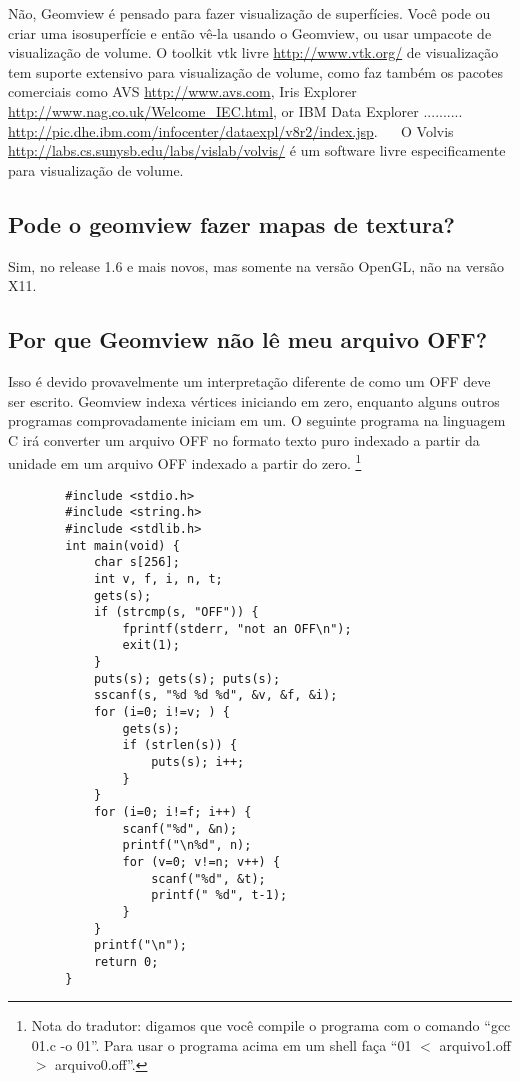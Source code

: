 \documentclass[12pt,a4paper]{article}
\begin{document}
        N\~ao, Geomview \'e pensado para fazer visualiza\c{c}\~ao de superf\'icies. Voc\^e pode ou
        criar uma isosuperf\'icie e ent\~ao v\^e-la usando o Geomview, ou usar umpacote de
        visualiza\c{c}\~ao de volume. O toolkit vtk livre \url{http://www.vtk.org/}
        de visualiza\c{c}\~ao tem suporte extensivo para visualiza\c{c}\~ao de volume, como faz tamb\'em
        os pacotes comerciais como AVS \url{http://www.avs.com}, Iris Explorer
        \url{http://www.nag.co.uk/Welcome\_IEC.html}, or IBM Data Explorer
        ..........\\ \url{http://pic.dhe.ibm.com/infocenter/dataexpl/v8r2/index.jsp}. \,\,\,\,\,\,\,\,O Volvis
        \url{http://labs.cs.sunysb.edu/labs/vislab/volvis/} \'e um software livre especificamente para
        visualiza\c{c}\~ao de volume.

    \subsection{Pode o geomview fazer mapas de textura?}

        Sim, no release 1.6 e mais novos, mas somente na vers\~ao OpenGL, n\~ao na
        vers\~ao X11.

    \subsection{Por que Geomview n\~ao l\^e meu arquivo OFF?}

        Isso \'e devido provavelmente um interpreta\c{c}\~ao diferente de como um OFF deve
        ser escrito. Geomview indexa v\'ertices iniciando em zero, enquanto alguns outros
        programas comprovadamente iniciam em um. O seguinte programa na linguagem C ir\'a converter
        um arquivo OFF no formato texto puro indexado a partir da unidade em um arquivo OFF indexado a partir do zero.
        \footnote{Nota do tradutor: digamos que voc\^e compile o programa com o comando
        ``gcc 01.c -o 01''. Para usar o programa acima em um shell fa\c{c}a ``01 $<$ arquivo1.off $>$ arquivo0.off''.}
        \begin{verbatim}
        #include <stdio.h>
        #include <string.h>
        #include <stdlib.h>
        int main(void) {
            char s[256];
            int v, f, i, n, t;
            gets(s);
            if (strcmp(s, "OFF")) {
                fprintf(stderr, "not an OFF\n");
                exit(1);
            }
            puts(s); gets(s); puts(s);
            sscanf(s, "%d %d %d", &v, &f, &i);
            for (i=0; i!=v; ) {
                gets(s);
                if (strlen(s)) {
                    puts(s); i++;
                }
            }
            for (i=0; i!=f; i++) {
                scanf("%d", &n);
                printf("\n%d", n);
                for (v=0; v!=n; v++) {
                    scanf("%d", &t);
                    printf(" %d", t-1);
                }
            }
            printf("\n");
            return 0;
        }
        \end{verbatim}
\end{document}
